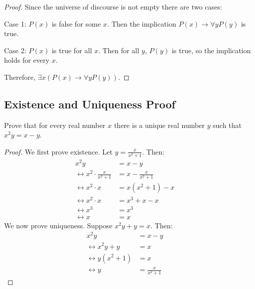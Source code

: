 \begin{proof}
    Since the universe of discourse is not empty
    there are two cases:

    Case 1: $P(x)$ is false for some $x$. Then the implication $P(x) \rightarrow
        \forall{y}P(y)$ is true.

    Case 2: $P(x)$ is true for all $x$. Then for all $y$, $P(y)$ is true, so the
    implication holds for every $x$.

    Therefore, $\exists{x}(P(x) \rightarrow \forall{y}P(y))$.
\end{proof}

\subsection{Existence and Uniqueness Proof}

\begin{tcolorbox}[title=Problem 1, breakable]
    Prove that for every real number $x$ there is a unique
    real number $y$ such that $x^2y = x - y$.
\end{tcolorbox}

\begin{proof}
    We first prove existence. Let $y = \frac{x}{x^2 + 1}$.
    Then:
    \begin{align*}
        x^2y                                        & = x - y                 &  & \\
        \leftrightarrow x^2 \cdot \frac{x}{x^2 + 1} & = x - \frac{x}{x^2 + 1} &  & \\
        \leftrightarrow x^2 \cdot x                 & = x(x^2 + 1) - x        &  & \\
        \leftrightarrow x^2 \cdot x                 & = x^3 + x - x           &  & \\
        \leftrightarrow x^3                         & = x^3                   &  & \\
        \leftrightarrow x                           & = x
    \end{align*}
    We now prove uniqueness. Suppose $x^2y + y = x$.
    Then:
    \begin{align*}
        x^2y                       & = x - y             &  &   \\
        \leftrightarrow x^2y + y   & = x                 &  &   \\
        \leftrightarrow y(x^2 + 1) & = x                 &  &   \\
        \leftrightarrow y          & = \frac{x}{x^2 + 1} &  & 
    \end{align*}
\end{proof}


